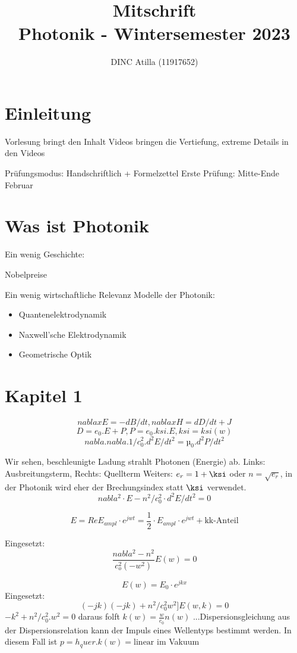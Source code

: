 \documentclass[a4paper]{article}
\title{Mitschrift\\Photonik - Wintersemester 2023}
\author{DINC Atilla (11917652)}
\begin{document}
\normalsize
\maketitle


\section*{Einleitung}
Vorlesung bringt den Inhalt
Videos bringen die Vertiefung, extreme Details in den Videos

Prüfungsmodus:
Handschriftlich + Formelzettel
Erste Prüfung: Mitte-Ende Februar

\section*{Was ist Photonik}
Ein wenig Geschichte:
\item Nobelpreise

Ein wenig wirtschaftliche Relevanz
Modelle der Photonik:
\begin{itemize}
    \item Quantenelektrodynamik
    \item Naxwell'sche Elektrodynamik
    \item Geometrische Optik
\end{itemize}

\section*{Kapitel 1}
\[ nablaxE=-dB/dt ,   nablaxH=dD/dt + J \]
\[ D=e_0.E+P, P=e_0.ksi.E, ksi=ksi(w) \]
\[ nabla.nabla.1/c_0^2.d^2E/dt^2 = µ_0.d^2P/dt^2 \]

Wir sehen, beschleunigte Ladung strahlt Photonen (Energie) ab.
Links: Ausbreitungsterm, Rechts: Quellterm
Weiters: $e_r=1+\ksi$ oder $n=\sqrt{e_r}$, in der Photonik wird eher der Brechungsindex statt $\ksi$ verwendet.
\[ nabla^2\cdot E-n^2/c_0^2\cdot d^2E/dt^2=0 \]

\[ E=Re{E_{ampl}\cdot e^{jwt}}=\frac{1}{2}\cdot E_{ampl}\cdot e^{jwt} + \text{kk-Anteil} \]

Eingesetzt:
\[ \frac{nabla^2-n^2}{c_o^2(-w^2)}E(w)=0 \]


\[ E(w)=E_0\cdot e^{jkx} \]
Eingesetzt:
\[ (-jk)(-jk)+n^2/c_0^2w^2]E(w,k)=0 \]
$-k^2+n^2/c_0^2.w^2=0 $ daraus folft $k(w)=\frac{w}{c_0}n(w) $ ...Dispersionsgleichung
aus der Dispersionsrelation kann der Impuls eines Wellentyps bestimmt werden. In diesem Fall ist $p=h_quer.k(w)=\text{linear}$ im Vakuum
\end{document}
